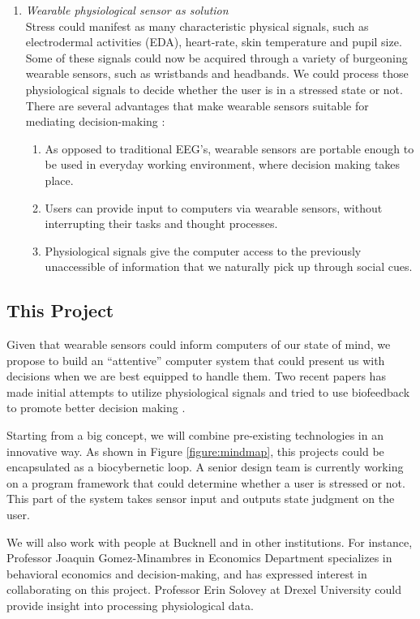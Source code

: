 \documentclass[12pt]{article}
\begin{document}
\begin{enumerate}
\item{\it Wearable physiological sensor as solution}\\
  Stress could manifest as many characteristic physical signals, such as electrodermal activities (EDA), heart-rate, skin temperature and pupil size. 
  Some of these signals could now be acquired through a variety of burgeoning wearable sensors, such as wristbands and headbands. We could process those physiological signals to decide whether the user is in a stressed state or not. There are several advantages that make wearable sensors suitable for mediating decision-making \parencite{Peck2014}:
  \begin{enumerate} 
  \itemsep0pt\parskip0pt
    \item As opposed to traditional EEG's, wearable sensors are portable enough to be used in everyday working environment, where decision making takes place.
    \item Users can provide input to computers via wearable sensors, without interrupting their tasks and thought processes.
    \item Physiological signals give the computer access to the previously unaccessible of information that we naturally pick up through social cues.
  \end{enumerate}
\end{enumerate}

\subsection{This Project}\label{this-project}

Given that wearable sensors could inform computers of our state of mind, we propose to build an ``attentive'' computer system that could present us with decisions when we are best equipped to handle them. 
Two recent papers has made initial attempts to utilize physiological signals and tried to use biofeedback to promote better decision making \parencite{Carroll2013, Zhou2015}. 

Starting from a big concept, we will combine pre-existing technologies in an innovative way. As shown in Figure \ref{figure:mindmap}, this projects could be encapsulated as a biocybernetic loop. A senior design team is currently working on a program framework that could determine whether a user is stressed or not. This part of the system takes sensor input and outputs state judgment on the user.


We will also work with people at Bucknell and in other institutions. For
instance, Professor Joaquin Gomez-Minambres in Economics Department specializes in behavioral economics and decision-making, and has expressed interest in collaborating on this project. Professor Erin Solovey at Drexel University could provide insight into processing physiological data.
\end{document}
